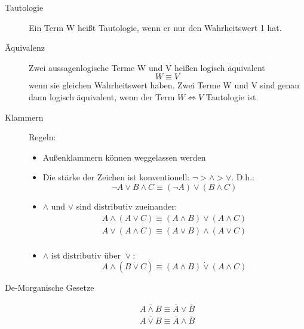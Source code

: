 \begin{description}
    \item[Tautologie] Ein Term W heißt Tautologie, wenn er nur den Wahrheitswert 1 hat.
    \item[Äquivalenz] Zwei aussagenlogische Terme W und V heißen logisch äquivalent \[W \equiv V\] wenn sie gleichen Wahrheitswert haben.
    Zwei Terme W und V sind genau dann logisch äquivalent, wenn der Term $W\Leftrightarrow V$ Tautologie ist.
    \item[Klammern] Regeln:
    \begin{itemize}
        \item Außenklammern können weggelassen werden
        \item Die stärke der Zeichen ist konventionell: $\neg > \wedge > \vee$.
        D.h.:
        \[\neg A \vee B \wedge C \equiv (\neg A) \vee (B \wedge C)\]
        \item $\wedge$ und $\vee$ sind distributiv zueinander:
        \begin{gather*}
            A \wedge (A \vee C) \equiv (A \wedge B) \vee (A \wedge C)\\
            A \vee (A \wedge C) \equiv (A \vee B) \wedge (A \vee C)\\
        \end{gather*}
        \item $\wedge$ ist distributiv über $\dot{\vee}$:
        \[A \wedge (B \dot{\vee} C) \equiv (A \wedge B) \dot{\vee} (A \wedge C)\]
    \end{itemize}
    \item[De-Morganische Gesetze] \begin{gather*}
                                      \overline{A \wedge B} \equiv \overline{A} \vee \overline{B}\\
                                      \overline{A \vee B} \equiv \overline{A} \wedge \overline{B}\\
    \end{gather*}
\end{description}
